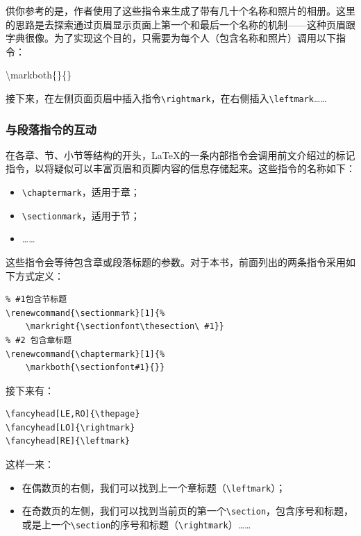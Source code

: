 \begin{ii}
    供你参考的是，作者使用了这些指令来生成了带有几十个名称和照片的相册。这里的思路是去探索通过页眉显示页面上第一个和最后一个名称的机制——这种页眉跟字典很像。为了实现这个目的，只需要为每个人（包含名称和照片）调用以下指令：
    
    \begin{dmd}
    \backslash markboth\{\}\{\}
    \end{dmd}
    
    接下来，在左侧页面页眉中插入指令\verb|\rightmark|，在右侧插入\verb|\leftmark|……
\end{ii}

\subsubsection{与段落指令的互动}

在各章、节、小节等结构的开头，\LaTeX 的一条内部指令会调用前文介绍过的标记指令，以将疑似可以丰富页眉和页脚内容的信息存储起来。这些指令的名称如下：

\begin{itemize}
    \item \verb|\chaptermark|，适用于章；
    \item \verb|\sectionmark|，适用于节；
    \item ……
\end{itemize}

这些指令会等待包含章或段落标题的参数。对于本书，前面列出的两条指令采用如下方式定义：

\begin{dmd}
\begin{verbatim}
% #1包含节标题
\renewcommand{\sectionmark}[1]{%
    \markright{\sectionfont\thesection\ #1}}
% #2 包含章标题
\renewcommand{\chaptermark}[1]{%
    \markboth{\sectionfont#1}{}}\end{verbatim}
\end{dmd}

接下来有：

\begin{dmd}
\begin{verbatim}
\fancyhead[LE,RO]{\thepage}
\fancyhead[LO]{\rightmark}
\fancyhead[RE]{\leftmark}\end{verbatim}
\end{dmd}

这样一来：

\begin{itemize}
    \item 在偶数页的右侧，我们可以找到上一个章标题（\verb|\leftmark|）；
    \item 在奇数页的左侧，我们可以找到当前页的第一个\verb|\section|，包含序号和标题，或是上一个\verb|\section|的序号和标题（\verb|\rightmark|）……
\end{itemize}

